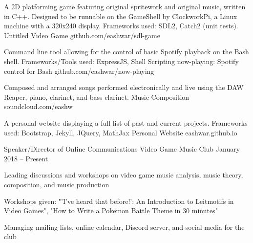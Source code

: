 \documentclass[]{awesome-cv}
\begin{document}
\vspace{-6mm}
\vspace{-3mm}

	\cventry
	{A 2D platforming game featuring original spritework and original music, written in C++. Designed to be runnable on the GameShell by ClockworkPi, a Linux machine with a 320x240 display. Frameworks used: SDL2, Catch2 (unit tests).}
	{Untitled Video Game}
	{github.com/eashwar/sdl-game}
	{}
	{}

	\vspace{-6mm}
	\cventry
	{Command line tool allowing for the control of basic Spotify playback on the Bash shell. Frameworks/Tools used: ExpressJS, Shell Scripting}
	{now-playing: Spotify control for Bash}
	{github.com/eashwar/now-playing}
	{}
	{}
	
	\vspace{-6mm}
	\cventry
	{Composed and arranged songs performed electronically and live using the DAW Reaper, piano, clarinet, and bass clarinet.}
	{Music Composition}
	{soundcloud.com/eashw}
	{}
	{}
	
	\vspace{-6mm}
	\cventry
	{A personal website displaying a full list of past and current projects. Frameworks used: Bootstrap, Jekyll, JQuery, MathJax}
	{Personal Website}
	{eashwar.github.io}
	{}
	{}
	
	\vspace{-6mm}

\vspace{-2mm}
\vspace{-3mm}
	\cventry
	{Speaker/Director of Online Communications}
	{Video Game Music Club}
	{}
	{January 2018 – Present}
	{\begin{cvitems}
		\item {Leading discussions and workshops on video game music analysis, music theory, composition, and music production}
		\item {Workshops given: "'I've heard that before!': An Introduction to Leitmotifs in Video Games", "How to Write a Pokemon Battle Theme in 30 minutes"}
		\item {Managing mailing lists, online calendar, Discord server, and social media for the club}
		\end{cvitems}}
\end{document}
